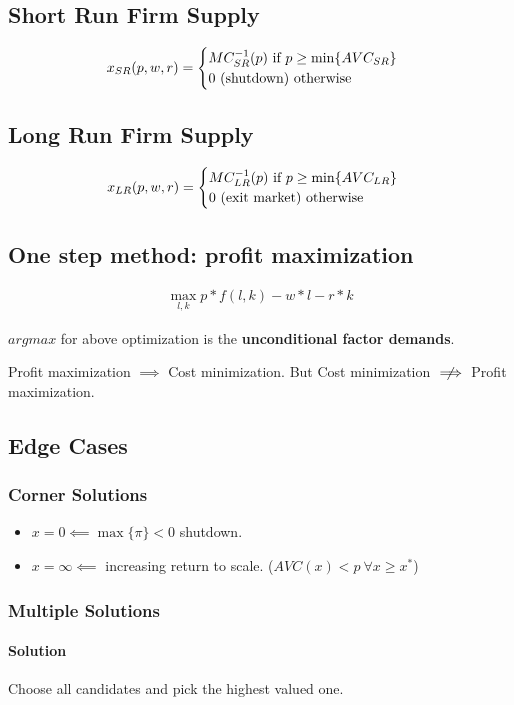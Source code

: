 \documentclass[]{article}
\begin{document}
        \subsection{Short Run Firm Supply}
            \[
                x_{SR}(p, w, r) =
                \begin{cases}
                    MC_{SR}^{-1}(p) \text{{ if }} p \geq \min\{AVC_{SR}\} \\
                    0 \text{{ (shutdown) otherwise }} \\
                \end{cases}
            \]
        
        \subsection{Long Run Firm Supply}
            \[
                x_{LR}(p, w, r) =
                \begin{cases}
                    MC_{LR}^{-1}(p) \text{{ if }} p \geq \min\{AVC_{LR}\} \\
                    0 \text{{ (exit market) otherwise }} \\
                \end{cases}
            \]
        
        \subsection{One step method: profit maximization}
            \begin{gather*}
                \max_{l, k} p*f(l, k) - w*l - r*k
            \end{gather*}
            
            \begin{remark}
                $argmax$ for above optimization is the \textbf{unconditional factor demands}.
            \end{remark}
            
            \begin{remark}
                Profit maximization $\implies$ Cost minimization. But Cost minimization $\centernot \implies$ Profit maximization.
            \end{remark}
        
        \subsection{Edge Cases}
            \subsubsection{Corner Solutions}
                \begin{itemize}
                    \item $x = 0 \impliedby \max\{\pi\} < 0$ shutdown.
                    \item $x = \infty \impliedby$ increasing return to scale. ($AVC(x) < p \ \forall x \geq x^*$)
                \end{itemize}
            \subsubsection{Multiple Solutions}
                \paragraph{Solution} Choose all candidates and pick the highest valued one.
\end{document}
